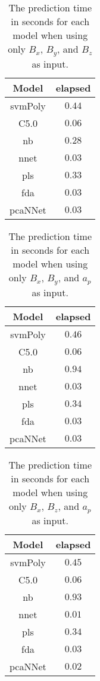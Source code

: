 \begin{table}[!ht]
	\centering
	\begin{tabular}{|c|c|}
		\hline
		Model & elapsed \\ \hline
		svmPoly & $0.44$ \\ \hline
		C5.0 & $0.06$ \\ \hline
		nb & $0.28$ \\ \hline
		nnet & $0.03$ \\ \hline
		pls & $0.33$ \\ \hline
		fda & $0.03$ \\ \hline
		pcaNNet & $0.03$ \\ \hline
	\end{tabular}
	\caption{The prediction time in seconds for each model when using only $B_{x}$, $B_{y}$, and $B_{z}$ as input.}
	\label{tab:time:coord:predict}
\end{table}

\begin{table}[!ht]
	\centering
	\begin{tabular}{|c|c|}
		\hline
		Model & elapsed \\ \hline
		svmPoly & $0.46$ \\ \hline
		C5.0 & $0.06$ \\ \hline
		nb & $0.94$ \\ \hline
		nnet & $0.03$ \\ \hline
		pls & $0.34$ \\ \hline
		fda & $0.03$ \\ \hline
		pcaNNet & $0.03$ \\ \hline
	\end{tabular}
	\caption{The prediction time in seconds for each model when using only $B_{x}$, $B_{y}$, and $a_{p}$ as input.}
	\label{tab:time:xyap:predict}
\end{table}

\begin{table}[!ht]
	\centering
	\begin{tabular}{|c|c|}
		\hline
		Model & elapsed \\ \hline
		svmPoly & $0.45$ \\ \hline
		C5.0 & $0.06$ \\ \hline
		nb & $0.93$ \\ \hline
		nnet & $0.01$ \\ \hline
		pls & $0.34$ \\ \hline
		fda & $0.03$ \\ \hline
		pcaNNet & $0.02$ \\ \hline
	\end{tabular}
	\caption{The prediction time in seconds for each model when using only $B_{x}$, $B_{z}$, and $a_{p}$ as input.}
	\label{tab:time:xzap:predict}
\end{table}


